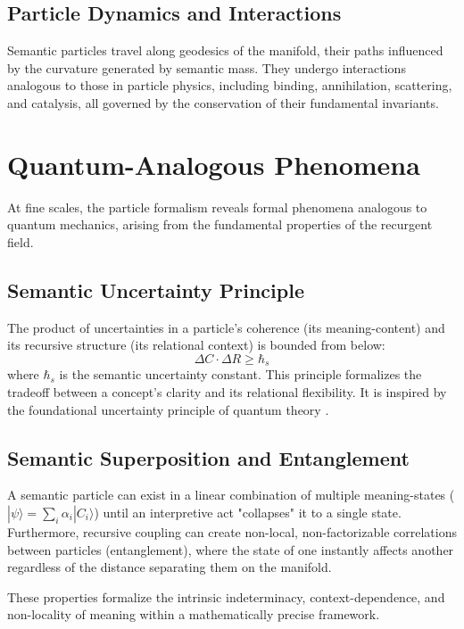 \subsection{Particle Dynamics and Interactions}
Semantic particles travel along geodesics of the manifold, their paths influenced by the curvature generated by semantic mass. They undergo interactions analogous to those in particle physics, including binding, annihilation, scattering, and catalysis, all governed by the conservation of their fundamental invariants.


\section{Quantum-Analogous Phenomena}

At fine scales, the particle formalism reveals formal phenomena analogous to quantum mechanics, arising from the fundamental properties of the recurgent field.


\subsection{Semantic Uncertainty Principle}
The product of uncertainties in a particle's coherence (its meaning-content) and its recursive structure (its relational context) is bounded from below:
\begin{equation}
\Delta C \cdot \Delta R \geq \hbar_s
\end{equation}
where \(\hbar_s\) is the semantic uncertainty constant. This principle formalizes the tradeoff between a concept's clarity and its relational flexibility. It is inspired by the foundational uncertainty principle of quantum theory \autocite{Heisenberg1927, WheelerZurek1983}.


\subsection{Semantic Superposition and Entanglement}
A semantic particle can exist in a linear combination of multiple meaning-states (\(|\psi\rangle = \sum_i \alpha_i |C_i\rangle\)) until an interpretive act "collapses" it to a single state. Furthermore, recursive coupling can create non-local, non-factorizable correlations between particles (entanglement), where the state of one instantly affects another regardless of the distance separating them on the manifold.

These properties formalize the intrinsic indeterminacy, context-dependence, and non-locality of meaning within a mathematically precise framework. 
